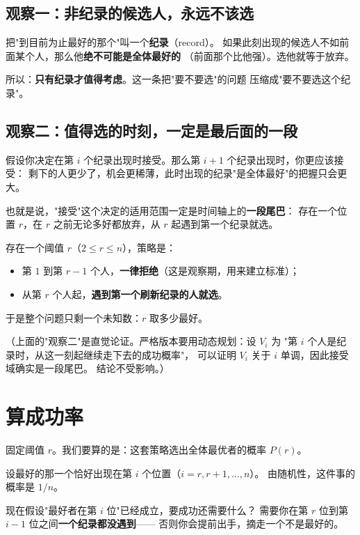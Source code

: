 \documentclass[UTF8,11pt,fontset=macnew]{ctexart}
\begin{document}
\subsection{观察一：非纪录的候选人，永远不该选}

把"到目前为止最好的那个"叫一个\textbf{纪录}（record）。
如果此刻出现的候选人不如前面某个人，那么他\textbf{绝不可能是全体最好的}
（前面那个比他强）。选他就等于放弃。

所以：\textbf{只有纪录才值得考虑}。这一条把"要不要选"的问题
压缩成"要不要选这个纪录"。

\subsection{观察二：值得选的时刻，一定是最后面的一段}

假设你决定在第 $i$ 个纪录出现时接受。那么第 $i+1$ 个纪录出现时，你更应该接受：
剩下的人更少了，机会更稀薄，此时出现的纪录"是全体最好"的把握只会更大。

也就是说，"接受"这个决定的适用范围一定是时间轴上的\textbf{一段尾巴}：
存在一个位置 $r$，在 $r$ 之前无论多好都放弃，从 $r$ 起遇到第一个纪录就选。

\begin{keybox}[最优策略的形状]
存在一个阈值 $r$（$2\le r\le n$），策略是：
\begin{itemize}
  \item 第 $1$ 到第 $r-1$ 个人，\textbf{一律拒绝}（这是观察期，用来建立标准）；
  \item 从第 $r$ 个人起，\textbf{遇到第一个刷新纪录的人就选}。
\end{itemize}
于是整个问题只剩一个未知数：$r$ 取多少最好。
\end{keybox}

（上面的"观察二"是直觉论证。严格版本要用动态规划：设 $V_i$ 为
"第 $i$ 个人是纪录时，从这一刻起继续走下去的成功概率"，
可以证明 $V_i$ 关于 $i$ 单调，因此接受域确实是一段尾巴。
结论不受影响。）

\section{算成功率}

固定阈值 $r$。我们要算的是：这套策略选出全体最优者的概率 $P(r)$。

设最好的那一个恰好出现在第 $i$ 个位置（$i=r,r+1,\dots,n$）。
由随机性，这件事的概率是 $1/n$。

现在假设"最好者在第 $i$ 位"已经成立，要成功还需要什么？
需要你在第 $r$ 位到第 $i-1$ 位之间\textbf{一个纪录都没遇到}——
否则你会提前出手，摘走一个不是最好的。
\end{document}
